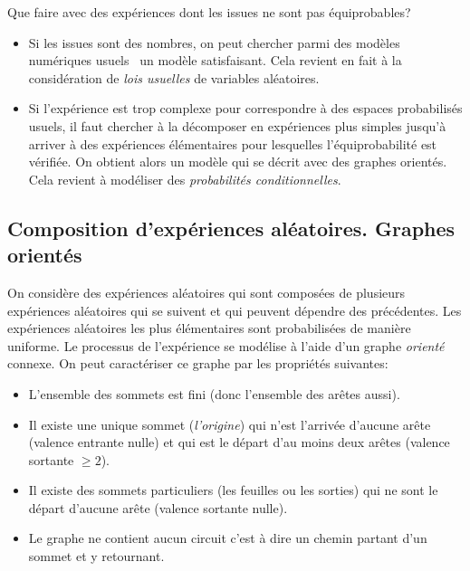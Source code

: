 Que faire avec des expériences dont les issues ne sont pas équiprobables?
\begin{itemize}
  \item Si les issues sont des nombres, on peut chercher parmi des \og modèles numériques usuels\fg~ un modèle satisfaisant. Cela revient en fait à la considération de \emph{lois usuelles} de variables aléatoires.
  \item Si l'expérience est trop complexe pour correspondre à des espaces probabilisés usuels, il faut chercher à la décomposer en expériences plus simples jusqu'à arriver à des expériences élémentaires pour lesquelles l'équiprobabilité est vérifiée. On obtient alors un modèle qui se décrit avec des graphes orientés. Cela revient à modéliser des \emph{probabilités conditionnelles}.
\end{itemize}
\clearpage
\subsection{Composition d'expériences aléatoires. Graphes orientés}
On considère des expériences aléatoires qui sont composées de plusieurs expériences aléatoires qui se suivent et qui peuvent dépendre des précédentes. Les expériences aléatoires les plus élémentaires sont probabilisées de manière uniforme. Le processus de l'expérience se modélise à l'aide d'un graphe \emph{orienté} connexe.\newline
On peut caractériser ce graphe par les propriétés suivantes:
\begin{itemize}
  \item L'ensemble des sommets est fini (donc l'ensemble des arêtes aussi).
  \item Il existe une unique sommet (\emph{l'origine}) qui n'est l'arrivée d'aucune arête (valence entrante nulle) et qui est le départ d'au moins deux arêtes (valence sortante $\geq2$).
  \item Il existe des sommets particuliers (les feuilles ou les sorties) qui ne sont le départ d'aucune arête (valence sortante nulle).
  \item Le graphe ne contient aucun circuit c'est à dire un chemin partant d'un sommet et y retournant.
\end{itemize}

